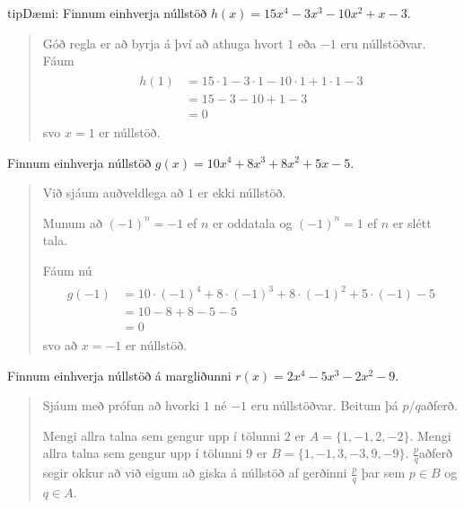 \documentclass[a4paper,10pt,icelandic]{sphinxmanual}
\begin{document}
\begin{sphinxadmonition}{tip}{Dæmi:}
 Finnum einhverja núllstöð \(h(x)=15x^4-3x^3-10x^2+x-3\).
\begin{quote}

Góð regla er að byrja á því að athuga hvort \(1\) eða \(-1\) eru núllstöðvar. Fáum
\begin{equation*}
\begin{split}\begin{aligned}
        h(1)&=15 \cdot 1-3 \cdot 1 -10 \cdot 1 + 1 \cdot 1 -3 \\
        &=15-3-10+1-3\\
        &=0
\end{aligned}\end{split}
\end{equation*}
svo \(x=1\) er núllstöð.
\end{quote}

 Finnum einhverja núllstöð \(g(x)=10x^4+8x^3+8x^2+5x-5\).
\begin{quote}

Við sjáum auðveldlega að \(1\) er ekki núllstöð.

Munum að \((-1)^n=-1\) ef \(n\) er oddatala og \((-1)^n=1\) ef \(n\) er slétt tala.

Fáum nú
\begin{equation*}
\begin{split}\begin{aligned}
        g(-1) &= 10 \cdot (-1)^4 + 8 \cdot (-1)^3 + 8 \cdot (-1)^2+5 \cdot (-1)-5\\
        & =10-8+8-5-5\\
        &=0
\end{aligned}\end{split}
\end{equation*}
svo að \(x=-1\) er núllstöð.
\end{quote}

 Finnum einhverja núllstöð á margliðunni \(r(x)=2x^4-5x^3-2x^2-9\).
\begin{quote}

Sjáum með prófun að hvorki \(1\) né \(-1\) eru núllstöðvar. Beitum þá \(p/q\)\sphinxhyphen{}aðferð.

Mengi allra talna sem gengur upp í tölunni \(2\) er \(A=\{1,-1,2,-2\}\).
Mengi allra talna sem gengur upp í tölunni \(9\) er \(B=\{1,-1,3,-3,9,-9 \}\).
\(\frac{p}{q}\)\sphinxhyphen{}aðferð segir okkur að við eigum að giska á núllstöð af gerðinni \(\frac{p}{q}\) þar sem \(p\in B\) og \(q\in A\).


\end{quote}
\end{sphinxadmonition}
\end{document}
